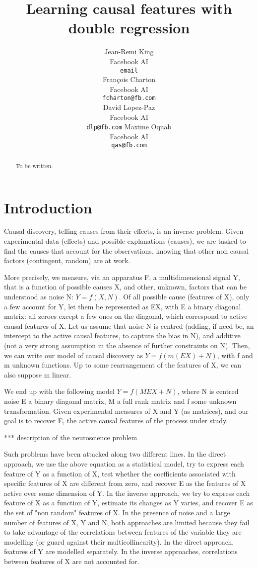 \documentclass{article}
\title{Learning causal features with double regression}
\author{%
  Jean-Remi King\\
  Facebook AI\\
  \texttt{email} \\
  \And
  Fran\c{c}ois Charton\\
  Facebook AI\\
  \texttt{fcharton@fb.com}\\
  \And
  David Lopez-Paz\\
  Facebook AI\\
  \texttt{dlp@fb.com}
  \And
  Maxime Oquab\\
  Facebook AI\\
  \texttt{qas@fb.com}
}
\begin{document}
\maketitle

\begin{abstract}
    To be written.
\end{abstract}

\section{Introduction}
Causal discovery, telling causes from their effects, is an inverse problem. Given experimental data (effects) and possible explanations (causes), we are tasked to find the causes that account for the observations, knowing that other non causal factors (contingent, random) are at work. 

More precisely, we measure, via an apparatus F, a multidimensional signal Y, that is a function of possible causes X, and other, unknown, factors that can be understood as noise N: $Y=f(X,N)$. Of all possible cause (features of X), only a few account for Y, let them be represented as EX, with E a binary diagonal matrix: all zeroes except a few ones on the diagonal, which correspond to active causal features of X. Let us assume that noise N is centred (adding, if need be, an intercept to the active causal features, to capture the bias in N), and additive (not a very strong assumption in the absence of further constraints on N). Then, we can write our model of causal discovery as $Y=f(m(EX)+N)$, with f and m unknown functions. Up to some rearrangement of the features of X, we can also suppose m linear.

We end up with the following model $Y=f(MEX+N)$, where N is centred noise E a binary diagonal matrix, M a full rank matrix and f some unknown transformation. Given experimental measures of X and Y (as matrices), and our goal is to recover E, the active causal features of the process under study.

*** description of the neuroscience problem

Such problems have been attacked along two different lines. In the direct approach, we use the above equation as a statistical model, try to express each feature of Y as a function of X, test whether the coefficients associated with specific features of X are different from zero, and recover E as the features of X active over some dimension of Y. In the inverse approach, we try to express each feature of X as a function of Y, estimate its changes as Y varies, and recover E as the set of "non random" features of X. In the presence of noise and a large number of features of X, Y and N, both approaches are limited because they fail to take advantage of the correlations between features of the variable they are modelling (or guard against their multicollinearity). In the direct approach, features of Y are modelled separately. In the inverse approaches, correlations between features of X are not accounted for. 
\end{document}
